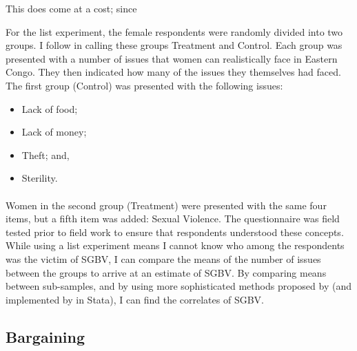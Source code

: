 \documentclass[11pt,a4paper]{scrartcl} %
\begin{document}

This does come at a cost; since 



For the list experiment, the female respondents were randomly divided into two groups. I follow \cite{Imai2011} in calling these groups Treatment and Control. Each group was presented with a number of issues that women can realistically face in Eastern Congo. They then indicated how many of the issues they themselves had faced. The first group (Control) was presented with the following issues:
\begin{itemize}
	\item Lack of food;
	\item Lack of money;
	\item Theft; and,
	\item Sterility. %
\end{itemize}

\paragraph{}
 Women in the second group (Treatment) were presented with the same four items, but a fifth item was added: Sexual Violence. The questionnaire was field tested prior to field work to ensure that respondents understood these concepts. While using a list experiment means I cannot know who among the respondents was the victim of SGBV, I can compare the means of the number of issues between the groups to arrive at an estimate of SGBV. By comparing means between sub-samples, and by using more sophisticated methods proposed by \citet{Imai2011} (and implemented by \cite{Tsai2019} in Stata), I can find the correlates of SGBV. 

\subsection*{Bargaining}
\end{document}
